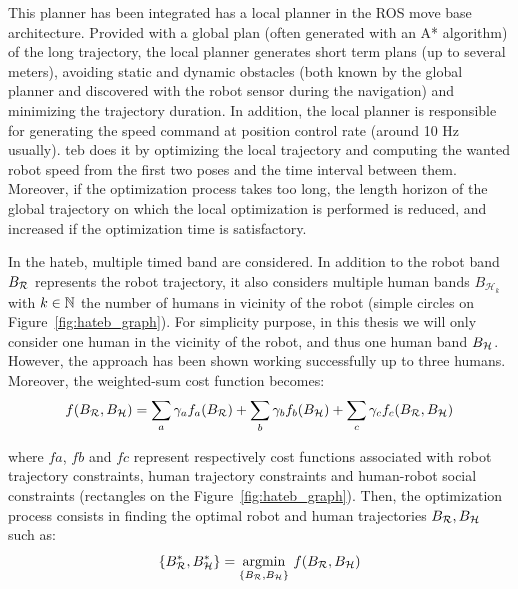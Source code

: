 \documentclass[a4paper,11pt,twoside]{StyleThese}
\begin{document}
This planner has been integrated has a local planner in the ROS move base architecture. Provided with a global plan (often generated with an A* algorithm) of the long trajectory, the local planner generates short term plans (up to several meters), avoiding static and dynamic obstacles (both known by the global planner and discovered with the robot sensor during the navigation) and minimizing the trajectory duration. In addition, the local planner is responsible for generating the speed command at position control rate (around 10 Hz usually). \acrshort{teb} does it by optimizing the local trajectory and computing the wanted robot speed from the first two poses and the time interval between them. Moreover, if the optimization process takes too long, the length horizon of the global trajectory on which the local optimization is performed is reduced, and increased if the optimization time is satisfactory.

In the \acrfull{hateb}, multiple timed band are considered. In addition to the robot band $B_\mathcal{R}$ represents the robot trajectory, it also considers multiple human bands $B_{\mathcal{H}_k}$ with $k \in \mathbb{N}$ the number of humans in vicinity of the robot (simple circles on Figure~\ref{fig:hateb_graph}). For simplicity purpose, in this thesis we will only consider one human in the vicinity of the robot, and thus one human band $B_\mathcal{H}$. However, the approach has been shown working successfully up to three humans.
Moreover, the weighted-sum cost function becomes:
\begin{equation} \label{eq:hateb_obj_function}
f(B_\mathcal{R}, B_\mathcal{H}) = \sum_a \gamma_a f_a(B_\mathcal{R}) + \sum_b \gamma_b f_b(B_\mathcal{H}) + \sum_c \gamma_c f_c(B_\mathcal{R}, B_\mathcal{H})
\end{equation}   

where $fa$, $fb$ and $fc$ represent respectively cost functions associated with robot trajectory constraints, human trajectory constraints and human-robot social constraints (rectangles on the Figure~\ref{fig:hateb_graph}). Then, the optimization process consists in finding the optimal robot and human trajectories $B_\mathcal{R}, B_\mathcal{H}$ such as:
\[\{B_\mathcal{R}^*, B_\mathcal{H}^*\} = \mathop{\mathrm{argmin}}_{\{B_\mathcal{R}, B_\mathcal{H}\}}\,f(B_\mathcal{R}, B_\mathcal{H})\]
\end{document}
